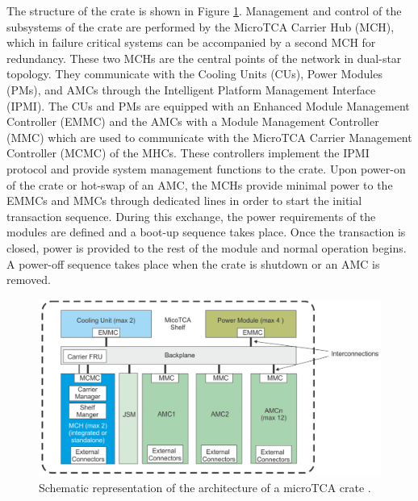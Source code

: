       The structure of the crate is shown in Figure \ref{fig:II-2-utca-crate}. Management and control of the subsystems of the crate are performed by the MicroTCA Carrier Hub (MCH), which in failure critical systems can be accompanied by a second MCH for redundancy. These two MCHs are the central points of the network in dual-star topology. They communicate with the Cooling Units (CUs), Power Modules (PMs), and AMCs through the Intelligent Platform Management Interface (IPMI). The CUs and PMs are equipped with an Enhanced Module Management Controller (EMMC) and the AMCs with a Module Management Controller (MMC) which are used to communicate with the MicroTCA Carrier Management Controller (MCMC) of the MHCs. These controllers implement the IPMI protocol and provide system management functions to the crate. Upon power-on of the crate or hot-swap of an AMC, the MCHs provide minimal power to the EMMCs and MMCs through dedicated lines in order to start the initial transaction sequence. During this exchange, the power requirements of the modules are defined and a boot-up sequence takes place. Once the transaction is closed, power is provided to the rest of the module and normal operation begins. A power-off sequence takes place when the crate is shutdown or an AMC is removed. \\

      \begin{figure}[t!]
        \centering
        \includegraphics[width=\textwidth]{img/II-2-daq/utca-crate.png}
        \caption{Schematic representation of the architecture of a microTCA crate \cite{VADATECH}.}
        \label{fig:II-2-utca-crate}
      \end{figure}

